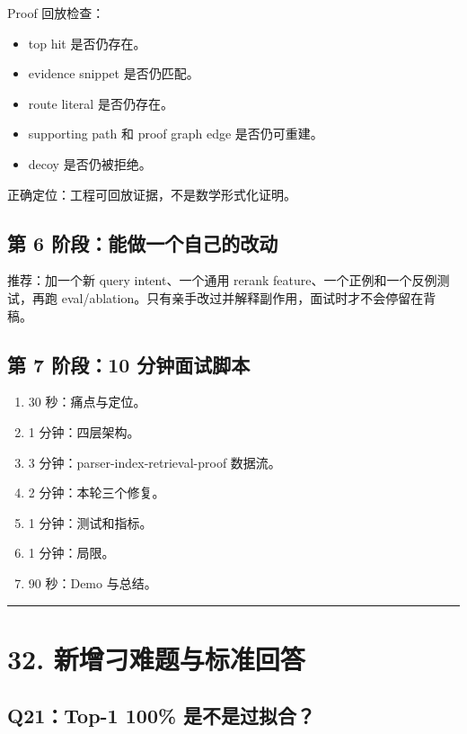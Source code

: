 \documentclass[UTF8,12pt,openany]{ctexbook}
\begin{document}
Proof 回放检查：\par

\begin{itemize}
\item top hit 是否仍存在。
\item evidence snippet 是否仍匹配。
\item route literal 是否仍存在。
\item supporting path 和 proof graph edge 是否仍可重建。
\item decoy 是否仍被拒绝。
\end{itemize}

正确定位：工程可回放证据，不是数学形式化证明。\par

\subsection{第 6 阶段：能做一个自己的改动}

推荐：加一个新 query intent、一个通用 rerank feature、一个正例和一个反例测试，再跑 eval/ablation。只有亲手改过并解释副作用，面试时才不会停留在背稿。\par

\subsection{第 7 阶段：10 分钟面试脚本}

\begin{enumerate}
\item 30 秒：痛点与定位。
\item 1 分钟：四层架构。
\item 3 分钟：parser-index-retrieval-proof 数据流。
\item 2 分钟：本轮三个修复。
\item 1 分钟：测试和指标。
\item 1 分钟：局限。
\item 90 秒：Demo 与总结。
\end{enumerate}

\hrule

\section{32. 新增刁难题与标准回答}

\subsection{Q21：Top-1 100\% 是不是过拟合？}
\end{document}
